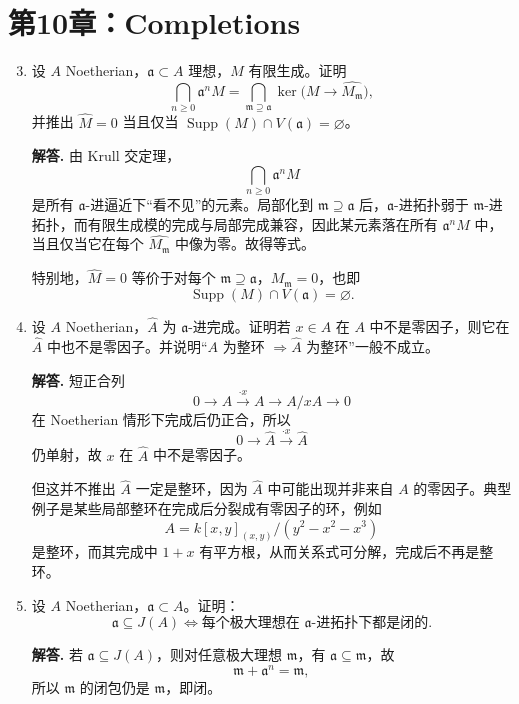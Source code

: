 \documentclass[a4paper]{ctexart}
\begin{document}
\section{第10章：Completions}

\begin{enumerate}[leftmargin=*, label=\textbf{10.\arabic*.}]
\setcounter{enumi}{2}
\item 设 \(A\) Noetherian，\(\mathfrak a\subset A\) 理想，\(M\) 有限生成。证明
\[
\bigcap_{n\ge 0}\mathfrak a^n M
=
\bigcap_{\mathfrak m\supseteq \mathfrak a}
\ker\!\bigl(M\to \widehat{M_{\mathfrak m}}\bigr),
\]
并推出 \(\widehat M=0\) 当且仅当 \(\operatorname{Supp}(M)\cap V(\mathfrak a)=\varnothing\)。

\textbf{解答.}
由 Krull 交定理，
\[
\bigcap_{n\ge 0}\mathfrak a^n M
\]
是所有 \(\mathfrak a\)-进逼近下“看不见”的元素。局部化到 \(\mathfrak m\supseteq \mathfrak a\) 后，\(\mathfrak a\)-进拓扑弱于 \(\mathfrak m\)-进拓扑，而有限生成模的完成与局部完成兼容，因此某元素落在所有 \(\mathfrak a^nM\) 中，当且仅当它在每个 \(\widehat{M_{\mathfrak m}}\) 中像为零。故得等式。

特别地，\(\widehat M=0\) 等价于对每个 \(\mathfrak m\supseteq \mathfrak a\)，\(M_{\mathfrak m}=0\)，也即
\[
\operatorname{Supp}(M)\cap V(\mathfrak a)=\varnothing.
\]

\setcounter{enumi}{3}
\item 设 \(A\) Noetherian，\(\widehat A\) 为 \(\mathfrak a\)-进完成。证明若 \(x\in A\) 在 \(A\) 中不是零因子，则它在 \(\widehat A\) 中也不是零因子。并说明“\(A\) 为整环 \(\Rightarrow \widehat A\) 为整环”一般不成立。

\textbf{解答.}
短正合列
\[
0\to A \xrightarrow{\cdot x} A \to A/xA\to 0
\]
在 Noetherian 情形下完成后仍正合，所以
\[
0\to \widehat A \xrightarrow{\cdot x} \widehat A
\]
仍单射，故 \(x\) 在 \(\widehat A\) 中不是零因子。

但这并不推出 \(\widehat A\) 一定是整环，因为 \(\widehat A\) 中可能出现并非来自 \(A\) 的零因子。典型例子是某些局部整环在完成后分裂成有零因子的环，例如
\[
A=k[x,y]_{(x,y)}/(y^2-x^2-x^3)
\]
是整环，而其完成中 \(1+x\) 有平方根，从而关系式可分解，完成后不再是整环。

\setcounter{enumi}{5}
\item 设 \(A\) Noetherian，\(\mathfrak a\subset A\)。证明：
\[
\mathfrak a\subseteq J(A)
\Longleftrightarrow
\text{每个极大理想在 }\mathfrak a\text{-进拓扑下都是闭的}.
\]

\textbf{解答.}
若 \(\mathfrak a\subseteq J(A)\)，则对任意极大理想 \(\mathfrak m\)，有 \(\mathfrak a\subseteq \mathfrak m\)，故
\[
\mathfrak m + \mathfrak a^n = \mathfrak m,
\]
所以 \(\mathfrak m\) 的闭包仍是 \(\mathfrak m\)，即闭。


\end{enumerate}
\end{document}
